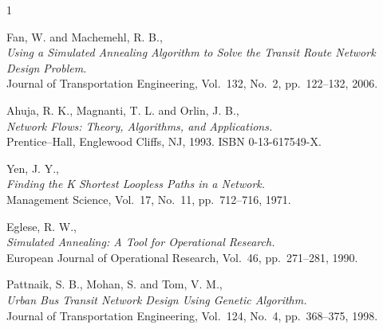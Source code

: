 \documentclass [a4paper, 11pt, titlepage] {article}
\begin{document}
\clearpage
\newpage
\label{litt}
\begin{thebibliography}{1}

Fan, W. and Machemehl, R. B., \\
\emph{Using a Simulated Annealing Algorithm to Solve the Transit Route Network
Design Problem.} \\
Journal of Transportation Engineering, Vol.\ 132, No.\ 2, pp.\ 122--132, 2006.

Ahuja, R. K., Magnanti, T. L. and Orlin, J. B., \\
\emph{Network Flows: Theory, Algorithms, and Applications.} \\
Prentice--Hall, Englewood Cliffs, NJ, 1993. ISBN 0-13-617549-X.

Yen, J. Y., \\
\emph{Finding the K Shortest Loopless Paths in a Network.} \\
Management Science, Vol.\ 17, No.\ 11, pp.\ 712--716, 1971.

Eglese, R. W., \\
\emph{Simulated Annealing: A Tool for Operational Research.} \\
European Journal of Operational Research, Vol.\ 46, pp.\ 271--281, 1990.

Pattnaik, S. B., Mohan, S. and Tom, V. M., \\
\emph{Urban Bus Transit Network Design Using Genetic Algorithm.} \\
Journal of Transportation Engineering, Vol.\ 124, No.\ 4, pp.\ 368--375, 1998.


\end{thebibliography}
\end{document}
